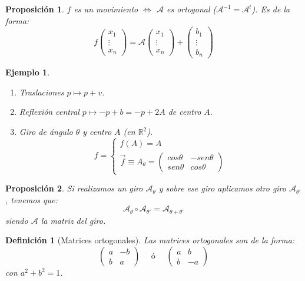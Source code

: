 \documentclass[11pt, a4paper]{article}
\newif\IfInSansMode
\newcommand{\R}{\mathbb{R}}
\renewcommand{\vec}{\overrightarrow}
\theoremstyle{theorem-style}
\newtheorem{nprop}{Proposición}[section]
\theoremstyle{definition-style}
\newtheorem{ndef}{Definición}[section]
\theoremstyle{remark-style}
\theoremstyle{example-style}
\newtheorem{ejemplo}{Ejemplo}[section]
\newenvironment{nlist}
{\begin{enumerate}
    \renewcommand\labelenumi{(\emph{\roman{enumi})}}}
  {\end{enumerate}}
\begin{document}
\begin{nprop}
  $f$ es un movimiento $\iff$ $\mathcal A$ es ortogonal ($\mathcal A ^{-1}= \mathcal A ^t$). Es de la forma:
  \[
    f \begin{pmatrix}
      x_1\\
      \vdots\\
      x_n 
    \end{pmatrix} = \mathcal A \begin{pmatrix}
      x_1\\
      \vdots\\
      x_n 
    \end{pmatrix} + \begin{pmatrix}
      b_1\\
      \vdots\\
      b_n 
    \end{pmatrix}
  \]
\end{nprop}


\begin{ejemplo}\hfill
  \begin{nlist}
  \item Traslaciones $p \mapsto p+v$.
  \item Reflexión central $p \mapsto -p +b= -p +2A$ de centro $A$.
  \item Giro de ángulo $\theta$ y centro $A$ (en $\R^2$).
    \[
      f= \begin{cases}
	f(A) = A \\
	\vec{f} \equiv A_{\theta} = \begin{pmatrix}
          cos \theta & -sen \theta\\
          sen \theta & cos \theta
        \end{pmatrix} 
      \end{cases}
    \]
  \end{nlist}
\end{ejemplo}

\begin{nprop}
  Si realizamos un giro $\mathcal A_\theta$ y sobre ese giro aplicamos otro giro $\mathcal A_{\theta'}$, tenemos que:
  \[
    \mathcal A_{\theta} \circ \mathcal A_{\theta'} = \mathcal A_{\theta+\theta'}
  \]
  siendo $\mathcal A$ la matriz del giro.
\end{nprop}

\begin{ndef}[Matrices ortogonales]
  Las matrices ortogonales son de la forma:
  \[
    \begin{pmatrix}
      a & -b \\
      b & a 
    \end{pmatrix} \quad \text { ó } \quad \begin{pmatrix}
      a & b \\
      b & -a 
    \end{pmatrix}
  \]
  con $a^2+b^2 = 1$.
\end{ndef}
\end{document}
